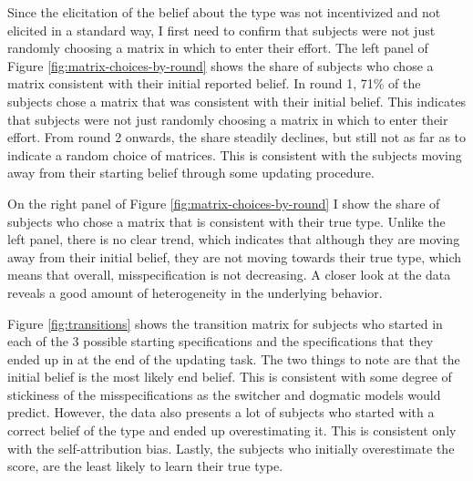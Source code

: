 \documentclass[
  12pt,
]{article}
\begin{document}
Since the elicitation of the belief about the type was not incentivized
and not elicited in a standard way, I first need to confirm that
subjects were not just randomly choosing a matrix in which to enter
their effort. The left panel of Figure \ref{fig:matrix-choices-by-round}
shows the share of subjects who chose a matrix consistent with their
initial reported belief. In round 1, 71\% of the subjects chose a matrix
that was consistent with their initial belief. This indicates that
subjects were not just randomly choosing a matrix in which to enter
their effort. From round 2 onwards, the share steadily declines, but
still not as far as to indicate a random choice of matrices. This is
consistent with the subjects moving away from their starting belief
through some updating procedure.

On the right panel of Figure \ref{fig:matrix-choices-by-round} I show
the share of subjects who chose a matrix that is consistent with their
true type. Unlike the left panel, there is no clear trend, which
indicates that although they are moving away from their initial belief,
they are not moving towards their true type, which means that overall,
misspecification is not decreasing. A closer look at the data reveals a
good amount of heterogeneity in the underlying behavior.

Figure \ref{fig:transitions} shows the transition matrix for subjects
who started in each of the 3 possible starting specifications and the
specifications that they ended up in at the end of the updating task.
The two things to note are that the initial belief is the most likely
end belief. This is consistent with some degree of stickiness of the
misspecifications as the switcher and dogmatic models would predict.
However, the data also presents a lot of subjects who started with a
correct belief of the type and ended up overestimating it. This is
consistent only with the self-attribution bias. Lastly, the subjects who
initially overestimate the score, are the least likely to learn their
true type.
\end{document}
